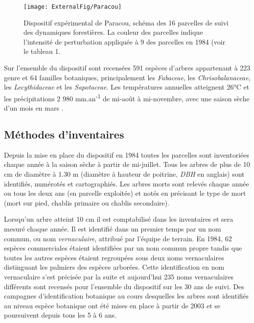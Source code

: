 \documentclass[
  11pt,
  french,
  A4paper,
  extrafontsizes,onecolumn,openright
  ]{memoir}
\begin{document}
\begin{figure}

{\centering \texttt{[image: ExternalFig/Paracou]} 

}

\caption{Dispositif expérimental de Paracou, schéma des 16 parcelles de suivi des dynamiques forestières. La couleur des parcelles indique l'intensité de perturbation appliquée à 9 des parcelles en 1984 (voir le tableau 1.}\label{fig:ParacouDesign}
\end{figure}

Sur l'ensemble du dispositif sont recensées 591 espèces d'arbres
appartenant à 223 genre et 64 familles botaniques, principalement les
\emph{Fabaceae}, les \emph{Chrisobalanaceae}, les \emph{Lecythidaceae}
et les \emph{Sapotaceae}. Les températures annuelles atteignent 26°C et
les précipitations 2 980 mm.an\textsuperscript{-1} de mi-août à
mi-novembre, avec une saison sèche d'un mois en mars
\autocite{Wagner2011}.

\subsection{Méthodes d'inventaires}\label{methodes-dinventaires}

Depuis la mise en place du dispositif en 1984 toutes les parcelles sont
inventoriées chaque année à la saison sèche à partir de mi-juillet. Tous
les arbres de plus de 10 cm de diamètre à 1.30 m (diamètre à hauteur de
poitrine, \emph{DBH} en anglais) sont identifiés, numérotés et
cartographiés. Les arbres morts sont relevés chaque année ou tous les
deux ans (en parcelle exploitée) et notés en précisant le type de mort
(mort sur pied, chablis primaire ou chablis secondaire).

Lorsqu'un arbre atteint 10 cm il est comptabilisé dans les inventaires
et sera mesuré chaque année. Il est identifié dans un premier temps par
un nom commun, ou nom \emph{vernaculaire}, attribué par l'équipe de
terrain. En 1984, 62 espèces commerciales étaient identifiées par un nom
commun propre tandis que toutes les autres espèces étaient regroupées
sous deux noms vernaculaires distinguant les palmiers des espèces
arborées. Cette identification en nom vernaculaire s'est précisée par la
suite et aujourd'hui 235 noms vernaculaires différents sont recensés
pour l'ensemble du dispositif sur les 30 ans de suivi. Des campagnes
d'identification botanique au cours desquelles les arbres sont
identifiés au niveau espèce botanique ont été mises en place à partir de
2003 et se poursuivent depuis tous les 5 à 6 ans.
\end{document}
